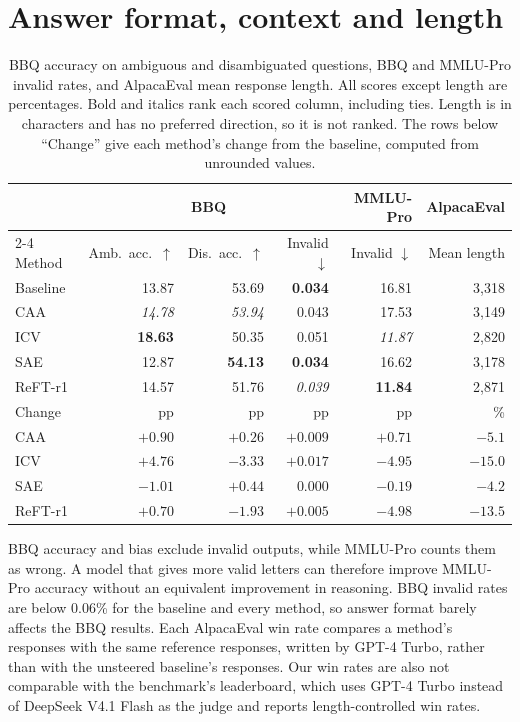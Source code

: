 \documentclass{article}
\begin{document}
\section{Answer format, context and length}
\label{app:diagnostics}

\begin{table}[h]
  \caption{BBQ accuracy on ambiguous and disambiguated questions, BBQ and MMLU-Pro invalid rates, and AlpacaEval mean response length. All scores except length are percentages. Bold and italics rank each scored column, including ties. Length is in characters and has no preferred direction, so it is not ranked. The rows below ``Change'' give each method's change from the baseline, computed from unrounded values.}
  \label{tab:diagnostics}
  \centering\small
  \setlength{\tabcolsep}{5pt}
  \begin{tabular}{lrrrrr}
    \toprule
    & \multicolumn{3}{c}{BBQ} & MMLU-Pro & AlpacaEval \\
    \cmidrule(lr){2-4}
    Method & Amb.\ acc.\ $\uparrow$ & Dis.\ acc.\ $\uparrow$ & Invalid $\downarrow$ & Invalid $\downarrow$ & Mean length \\
    \midrule
    Baseline & 13.87 & 53.69 & \textbf{0.034} & 16.81 & 3,318 \\
    CAA & \textit{14.78} & \textit{53.94} & 0.043 & 17.53 & 3,149 \\
    ICV & \textbf{18.63} & 50.35 & 0.051 & \textit{11.87} & 2,820 \\
    SAE & 12.87 & \textbf{54.13} & \textbf{0.034} & 16.62 & 3,178 \\
    ReFT-r1 & 14.57 & 51.76 & \textit{0.039} & \textbf{11.84} & 2,871 \\
    \midrule
    Change & pp & pp & pp & pp & \% \\
    CAA & $+0.90$ & $+0.26$ & $+0.009$ & $+0.71$ & $-5.1$ \\
    ICV & $+4.76$ & $-3.33$ & $+0.017$ & $-4.95$ & $-15.0$ \\
    SAE & $-1.01$ & $+0.44$ & $0.000$ & $-0.19$ & $-4.2$ \\
    ReFT-r1 & $+0.70$ & $-1.93$ & $+0.005$ & $-4.98$ & $-13.5$ \\
    \bottomrule
  \end{tabular}
\end{table}

BBQ accuracy and bias exclude invalid outputs, while MMLU-Pro counts them as wrong. A model that gives more valid letters can therefore improve MMLU-Pro accuracy without an equivalent improvement in reasoning. BBQ invalid rates are below 0.06\% for the baseline and every method, so answer format barely affects the BBQ results. Each AlpacaEval win rate compares a method's responses with the same reference responses, written by GPT-4 Turbo, rather than with the unsteered baseline's responses. Our win rates are also not comparable with the benchmark's leaderboard, which uses GPT-4 Turbo instead of DeepSeek V4.1 Flash as the judge and reports length-controlled win rates.
\end{document}
